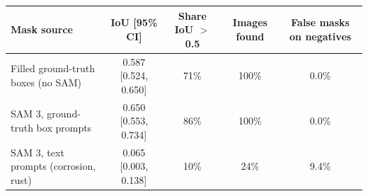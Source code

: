 \begin{tabular}{lcccc}
\toprule
Mask source & IoU [95\% CI] & Share IoU $>$ 0.5 & Images found & False masks on negatives \\
\midrule
Filled ground-truth boxes (no SAM) & 0.587 [0.524, 0.650] & 71\% & 100\% & 0.0\% \\
SAM 3, ground-truth box prompts & 0.650 [0.553, 0.734] & 86\% & 100\% & 0.0\% \\
SAM 3, text prompts (corrosion, rust) & 0.065 [0.003, 0.138] & 10\% & 24\% & 9.4\% \\
\bottomrule
\end{tabular}
